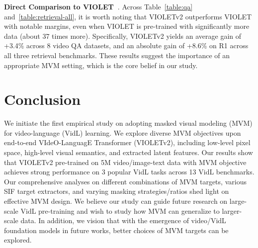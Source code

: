 \documentclass[10pt,twocolumn,letterpaper]{article}
\newcommand{\modelname}{VIOLETv2\xspace}
\newcommand{\modelorig}{VIOLET\xspace}
\begin{document}
\noindent\textbf{Direct Comparison to \modelorig~\cite{fu2021violet}}. Across Table~\ref{table:qa} and~\ref{table:retrieval-all}, it is worth noting that \modelname outperforms \modelorig with notable margins, even when \modelorig is pre-trained with significantly more data (about 37 times more). Specifically, \modelname yields an average gain of +3.4\% across 8 video QA datasets, and an absolute gain of +8.6\% on R1 across all three retrieval benchmarks. These results suggest the importance of an appropriate MVM setting, which is the core belief in our study. 
 
\section{Conclusion}
We initiate the first empirical study on adopting masked visual modeling (MVM) for video-language (VidL) learning. We explore diverse MVM objectives upon end-to-end VIdeO-LanguagE Transformer (\modelname), including low-level pixel space, high-level visual semantics, and extracted latent features. Our results show that \modelname pre-trained on 5M video/image-text data with MVM objective achieves strong performance on 3 popular VidL tasks
across 13 VidL benchmarks.
Our comprehensive analyses on different combinations of MVM targets, various SIF target extractors, and varying masking strategies/ratios shed light on effective MVM design. We believe our study can guide future research on large-scale VidL pre-training and wish to study how MVM can generalize to larger-scale data. In addition, we vision that with the emergence of video/VidL foundation models in future works, better choices of MVM targets can be explored.
\appendix
\appendix
\end{document}
